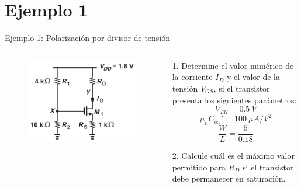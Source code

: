 \documentclass[t,aspectratio=169]{beamer}
\begin{document}
\section{Ejemplo 1}
\begin{frame}{Ejemplo 1: Polarización por divisor de tensión}

\begin{columns}

\begin{column}{0.4\textwidth}

\begin{figure}
\centering
\includegraphics[width=\textwidth]{figuras/mosfet_polarizacion_divisor.png}
\end{figure}

\end{column}

\begin{column}{0.6\textwidth}

1. Determine el valor numérico de la corriente $I_D$ y el valor de la tensión $V_{GS}$, si el transistor presenta los siguientes parámetros:
%
\[ V_{TH} = 0.5\ V \]
%
\[ \mu_n C_{ox}' = 100\ \mu A/V^2 \]
%
\[ \dfrac{W}{L} = \dfrac{5}{0.18} \]

\vspace{5mm}
2. Calcule cuál es el máximo valor permitido para $R_D$ si el transistor debe permanecer en saturación.

\end{column}

\end{columns}

\end{frame}
\end{document}
